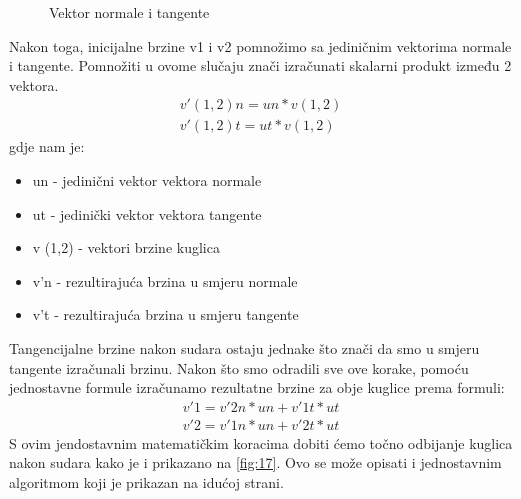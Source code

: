 \begin{figure}[!http]
	\begin{center}
	\end{center}
	\caption {Vektor normale i tangente}
	\label{fig:18}
\end{figure}
Nakon toga, inicijalne brzine v1 i v2 pomnožimo sa jediničnim vektorima normale i tangente\cite{2}. Pomnožiti u ovome slučaju znači izračunati skalarni produkt između 2 vektora.
\begin{equation}\label{equ:dot_vector}
\begin{aligned}
		v'(1,2)n = un * v(1,2) \\
		v'(1,2)t = ut * v(1,2)
	\end{aligned}
\end{equation}
gdje nam je:
\begin{itemize}
	\item un - jedinični vektor vektora normale
	\item ut - jedinički vektor vektora tangente
	\item v (1,2) - vektori brzine kuglica
	\item v'n - rezultirajuća brzina u smjeru normale
	\item v't - rezultirajuća brzina u smjeru tangente
\end{itemize}
Tangencijalne brzine nakon sudara ostaju jednake što znači da smo u smjeru tangente izračunali brzinu\cite{2}. Nakon što smo odradili sve ove korake, pomoću jednostavne formule izračunamo rezultatne brzine za obje kuglice prema formuli:
\begin{equation}\label{equ:final_vec}
	\begin{aligned}
		v'1 = v'2n * un + v'1t * ut \\
		v'2 = v'1n * un + v'2t * ut
		\end{aligned}
\end{equation}
S ovim jendostavnim matematičkim koracima dobiti ćemo točno odbijanje kuglica nakon sudara kako je i prikazano na \ref{fig:17}. Ovo se može opisati i jednostavnim algoritmom koji je prikazan na idućoj strani.
